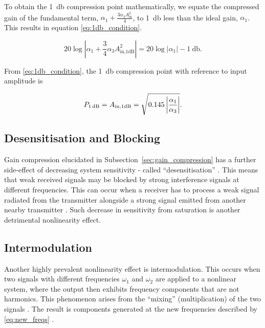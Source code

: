To obtain the \qty{1}{\decibel} compression point mathematically, we equate the compressed gain of the fundamental term, $\alpha_1 + \frac{3\alpha_3 A_{\text{in}}^2}{4}$, to \qty{1}{\decibel} less than the ideal gain, $\alpha_1$. This results in equation \eqref{eq:1db_condition}.

\begin{equation}
  20\log\left|\alpha_1 + \frac{3}{4}\alpha_3 A_{\text{in,1dB}}^2\right|
  = 20\log\left|\alpha_1\right| - \qty{1}{\decibel} .
  \label{eq:1db_condition}
\end{equation}

From \eqref{eq:1db_condition}, the \qty{1}{\decibel} compression point with reference to input amplitude is

\begin{equation}
  P_{\text{\qty{1}{\decibel}}} = A_{\text{in,1dB}} = \sqrt{0.145\left|\frac{\alpha_1}{\alpha_3}\right|} .
  \label{eq:1db_point}
\end{equation}

\subsection{Desensitisation and Blocking}

Gain compression elucidated in Subsection~\ref{sec:gain_compression} has a further side-effect of decreasing system sensitivity - called ``desensitisation'' \cite{maas}. This means that weak received signals may be blocked by strong interference signals at different frequencies. This can occur when a receiver has to process a weak signal radiated from the transmitter alongside a strong signal emitted from another nearby transmitter \cite{wambacq}. Such decrease in sensitivity from saturation is another detrimental nonlinearity effect.   

\subsection{Intermodulation}

Another highly prevalent nonlinearity effect is intermodulation. This occurs when two signals with different frequencies $\omega_1$ and $\omega_2$ are applied to a nonlinear system, where the output then exhibits frequency components that are not harmonics. This phenomenon arises from the ``mixing'' (multiplication) of the two signals \cite{razavi}. The result is components generated at the new frequencies described by \eqref{eq:new_freqs} \cite{lee}.

